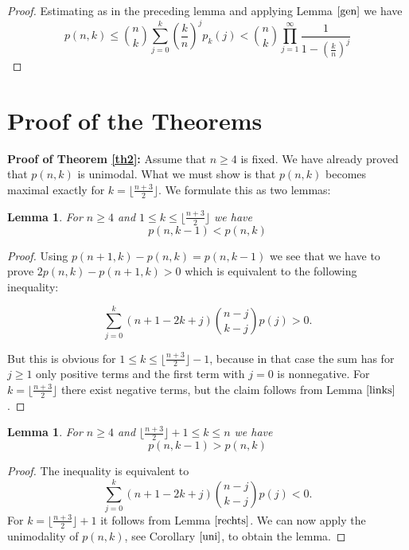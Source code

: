 \documentclass[12pt]{amsart}
\newtheorem{lem}[thm]{Lemma}
\theoremstyle{definition}
\theoremstyle{remark}
\newcommand{\lf}{\lfloor}
\newcommand{\rf}{\rfloor}
\begin{document}
\begin{proof}
Estimating as in the preceding lemma and applying Lemma $\ref{gen}$ we have 
\begin{equation*}
p(n,k)\le\binom{n}{k}\sum_{j=0}^{k} \left(\frac{k}{n}\right)^j p_k(j)<
\binom{n}{k}\prod_{j=1}^{\infty} \frac{1}{1-(\frac{k}{n})^j}
\end{equation*}
\end{proof}   

\section{Proof of the Theorems} 

{\bf Proof of Theorem \ref{th2}:} Assume that
$n\ge 4$ is fixed. We have already proved that $p(n,k)$
is unimodal. 
What we must show is that
$p(n,k)$ becomes maximal exactly for $k=\lfloor \frac{n+3}{2} \rfloor$.
We formulate this as two lemmas:

\begin{lem}
For $n\ge 4$ and $1\le k\le \lfloor\frac{n+3}{2}\rfloor$ we have
\begin{equation*} 
p(n,k-1) < p(n,k) 
\end{equation*}
\end{lem}

\begin{proof}
Using $p(n+1,k)-p(n,k)=p(n,k-1)$ we see that we have to prove
$2p(n,k)-p(n+1,k)>0$ which is equivalent to the following 
inequality:

\begin{equation*}
\sum_{j=0}^k (n+1-2k+j) \binom{n-j}{k-j}p(j)>0.
\end{equation*} 

But this is obvious for $1\le k\le \lf \frac{n+3}{2}\rf -1$, because
in that case the sum has for $j\ge 1$ only positive terms and the first
term with $j=0$ is nonnegative.
For $k=\lf \frac{n+3}{2}\rf $ there exist negative terms, but the claim
follows from Lemma $\ref{links}$.  

\end{proof}


\begin{lem}
For $n\ge 4$ and $\lfloor\frac{n+3}{2}\rfloor +1 \le k \le n$ we have
\begin{equation}\label{down} 
p(n,k-1) > p(n,k)
\end{equation} 
\end{lem}

\begin{proof}

The inequality is equivalent to
\begin{equation*}
\sum_{j=0}^k (n+1-2k+j) \binom{n-j}{k-j}p(j)<0.
\end{equation*} 
For $k=\lfloor\frac{n+3}{2}\rfloor +1$ 
it follows from Lemma $\ref{rechts}$. 
We can now apply the unimodality of $p(n,k)$, see Corollary $\ref{uni}$, to
obtain the lemma.
\end{proof}
\end{document}
